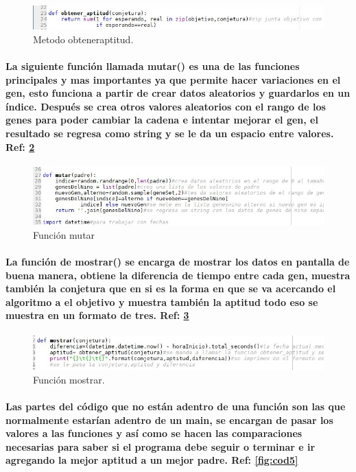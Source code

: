 \documentclass[10pt,a4paper]{article}
\begin{document}
\begin{figure}[H]
\includegraphics[scale=0.7] {img2.jpg}
\caption{Metodo obteneraptitud.}
\label{fig:cod2}
\end{figure}

\paragraph{
La siguiente funci\'on llamada mutar() es una de las funciones principales y mas importantes ya que permite hacer variaciones en el gen, esto funciona a partir de crear datos aleatorios y guardarlos en un \'indice. Despu\'es se crea otros valores aleatorios con el rango de los genes para poder cambiar la cadena e intentar mejorar el gen, el resultado se regresa como string y se le da un espacio entre valores. Ref: \ref{fig:cod3}
}
\begin{figure}[H]
\includegraphics[scale=0.7] {img3.jpg}
\caption{Funci\'on mutar}
\label{fig:cod3}
\end{figure}

\paragraph{ La funci\'on de mostrar() se encarga de mostrar los datos en pantalla de buena manera, obtiene la diferencia de tiempo entre cada gen, muestra tambi\'en la conjetura que en si es la forma en que se va acercando el algoritmo a el objetivo y muestra tambi\'en la aptitud todo eso se muestra en un formato de tres. Ref: \ref{fig:cod4}
}

\begin{figure}[H]
\includegraphics[scale=0.7] {img4.jpg}
\caption{Funci\'on mostrar.}
\label{fig:cod4}
\end{figure}


\paragraph{
Las partes del c\'odigo que no est\'an adentro de una funci\'on son las que normalmente estar\'ian adentro de un main, se encargan de pasar los valores a las funciones y as\'i como se hacen las comparaciones necesarias para saber si el programa debe seguir o terminar e ir agregando la mejor aptitud a un mejor padre. Ref: \ref{fig:cod5}
}
\end{document}
